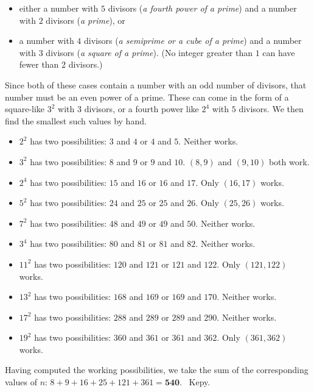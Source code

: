 \begin{enumerate}
 
            \begin{itemize}
        \item either a number with $5$ divisors (\textit{a fourth power of a prime}) and a number with $2$ divisors (\textit{a prime}), or
        \item a number with $4$ divisors (\textit{a semiprime or a cube of a prime}) and a number with $3$ divisors (\textit{a square of a prime}). (No integer greater than $1$ can have fewer than $2$ divisors.)
            \end{itemize}
            Since both of these cases contain a number with an odd number of divisors, that number must be an even power of a prime. These can come in the form of a square-like $3^2$ with $3$ divisors, or a fourth power like $2^4$ with $5$ divisors. We then find the smallest such values by hand.

 
            \begin{itemize}
        \item $2^2$ has two possibilities: $3$ and $4$ or $4$ and $5$. Neither works.
        \item $3^2$ has two possibilities: $8$ and $9$ or $9$ and $10$. $\boxed{(8,9)}$ and $\boxed{(9,10)}$ both work.
        \item $2^4$ has two possibilities: $15$ and $16$ or $16$ and $17$. Only $\boxed{(16,17)}$ works.
        \item $5^2$ has two possibilities: $24$ and $25$ or $25$ and $26$. Only $\boxed{(25,26)}$ works.
        \item $7^2$ has two possibilities: $48$ and $49$ or $49$ and $50$. Neither works.
        \item $3^4$ has two possibilities: $80$ and $81$ or $81$ and $82$. Neither works.
        \item $11^2$ has two possibilities: $120$ and $121$ or $121$ and $122$. Only $\boxed{(121,122)}$ works.
        \item $13^2$ has two possibilities: $168$ and $169$ or $169$ and $170$. Neither works.
        \item $17^2$ has two possibilities: $288$ and $289$ or $289$ and $290$. Neither works.
        \item $19^2$ has two possibilities: $360$ and $361$ or $361$ and $362$. Only $\boxed{(361,362)}$ works.
            \end{itemize}
            Having computed the working possibilities, we take the sum of the corresponding values of $n$: $8+9+16+25+121+361 = \boxed{\textbf{540}}$. ~Kepy.


\end{enumerate}
